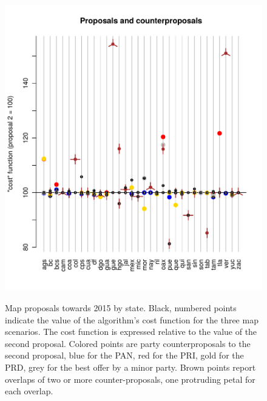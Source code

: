 \documentclass[letter,12pt]{article}
\begin{document}
\begin{figure}
\begin{center}
    \includegraphics[width=\columnwidth]{propsAndCost.pdf} \\
  \caption{Map proposals towards 2015 by state. Black, numbered points indicate the value of the algorithm's cost function for the three map scenarios. The cost function is expressed relative to the value of the second proposal. Colored points are party counterproposals to the second proposal, blue for the PAN, red for the PRI, gold for the PRD, grey for the best offer by a minor party. Brown points report overlaps of two or more counter-proposals, one protruding petal for each overlap.}\label{F:propsAndCost}
\end{center}
\end{figure}
\end{document}
